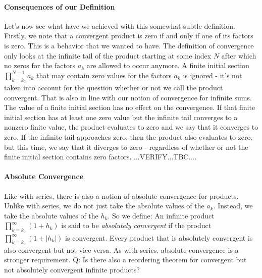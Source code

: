 \paragraph{Consequences of our Definition}
Let's now see what have we achieved with this somewhat subtle definition. Firstly, we note that a convergent product is zero if and only if one of its factors is zero. This is a behavior that we wanted to have. The definition of convergence only looks at the infinite tail of the product starting at some index $N$ after which no zeros for the factors $a_k$ are allowed to occur anymore. A finite initial section $\prod_{k=k_0}^{N-1} a_k$ that may contain zero values for the factors $a_k$ is ignored - it's not taken into account for the question whether or not we call the product convergent. That is also in line with our notion of convergence for infinite sums. The value of a finite initial section has no effect on the convergence. If that finite initial section has at least one zero value but the infinite tail converges to a nonzero finite value, the product evaluates to zero and we say that it converges to zero. If the infinite tail approaches zero, then the product also evaluates to zero, but this time, we say that it diverges to zero - regardless of whether or not the finite initial section contains zero factors. ...VERIFY...TBC....


\paragraph{Absolute Convergence}
Like with series, there is also a notion of absolute convergence for products. Unlike with series, we do not just take the absolute values of the $a_k$. Instead, we take the absolute values of the $h_k$. So we define: An infinite product $\prod_{k=k_0}^{\infty} (1 + h_k)$ is said to be \emph{absolutely convergent} if the product $\prod_{k=k_0}^{\infty} (1 + |h_k|)$ is convergent. Every product that is absolutely convergent is also convergent but not vice versa. As with series, absolute convergence is a stronger requirement. Q: Is there also a reordering theorem for convergent but not absolutely convergent infinite products?






